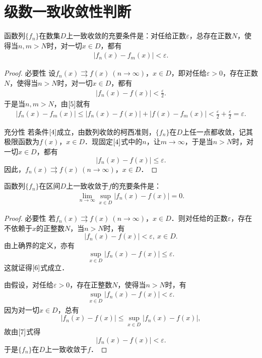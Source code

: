 \documentclass[../../main.tex]{subfiles}
\begin{document}
\section{级数一致收敛性判断}

\begin{theorem}[函数列一致收敛的柯西准则]\label{theorem:函数列一致收敛的柯西准则}
函数列\(\{f_n\}\)在数集\(D\)上一致收敛的充要条件是：对任给正数\(\varepsilon\)，总存在正数\(N\)，使得当\(n, m > N\)时，对一切\(x \in D\)，都有
\begin{align}
|f_n(x) - f_m(x)| < \varepsilon.\label{4}
\end{align}
\end{theorem}
\begin{proof}
{\heiti 必要性} 设\(f_n(x) \rightrightarrows f(x) \ (n \to \infty)\)，\(x \in D\)，即对任给\(\varepsilon > 0\)，存在正数\(N\)，使得当\(n > N\)时，对一切\(x \in D\)，都有
\begin{align}
|f_n(x) - f(x)| < \frac{\varepsilon}{2}. \label{5}
\end{align}
于是当\(n, m > N\)，由\(\eqref{5}\)就有
\begin{align*}
|f_n(x) - f_m(x)| \leqslant |f_n(x) - f(x)| + |f(x) - f_m(x)| < \frac{\varepsilon}{2} + \frac{\varepsilon}{2} = \varepsilon.
\end{align*}

{\heiti 充分性} 若条件\(\eqref{4}\)成立，由数列收敛的柯西准则，\(\{f_n\}\)在\(D\)上任一点都收敛，记其极限函数为\(f(x)\)，\(x \in D\)．现固定\(\eqref{4}\)式中的\(n\)，让\(m \to \infty\)，于是当\(n > N\)时，对一切\(x \in D\)，都有
\[
|f_n(x) - f(x)| \leqslant \varepsilon.
\]
因此，\(f_n(x) \rightrightarrows f(x) \ (n \to \infty)\)，\(x \in D\)．
\end{proof} 

\begin{theorem}
函数列\(\{f_n\}\)在区间\(D\)上一致收敛于\(f\)的充要条件是：
\begin{align}
\lim_{n \to \infty} \sup_{x \in D} |f_n(x) - f(x)| = 0. \label{6}
\end{align}
\end{theorem} 
\begin{proof}
{\heiti 必要性} 若\(f_n(x) \rightrightarrows f(x) \ (n \to \infty)\)，\(x \in D\)．则对任给的正数\(\varepsilon\)，存在不依赖于\(x\)的正整数\(N\)，当\(n > N\)时，有
\[
|f_n(x) - f(x)| < \varepsilon, \ x \in D.
\]
由上确界的定义，亦有
\[
\sup_{x \in D} |f_n(x) - f(x)| \leqslant \varepsilon.
\]
这就证得\(\eqref{6}\)式成立．

 由假设，对任给\(\varepsilon > 0\)，存在正整数\(N\)，使得当\(n > N\)时，有
\begin{align}
\sup_{x \in D} |f_n(x) - f(x)| < \varepsilon. \label{7}
\end{align}
因为对一切\(x \in D\)，总有
\[
|f_n(x) - f(x)| \leqslant \sup_{x \in D} |f_n(x) - f(x)|,
\]
故由\(\eqref{7}\)式得
\[
|f_n(x) - f(x)| < \varepsilon.
\]
于是\(\{f_n\}\)在\(D\)上一致收敛于\(f\)．
\end{proof}
\end{document}

